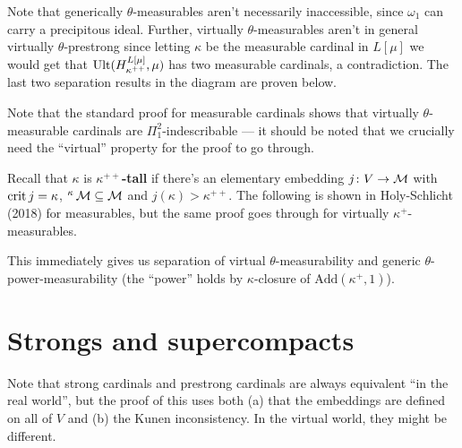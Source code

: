 Note that generically $\theta$-measurables aren't necessarily inaccessible, since $\omega_1$ can carry a precipitous ideal. Further, virtually $\theta$-measurables aren't in general virtually $\theta$-prestrong since letting $\kappa$ be the measurable cardinal in $L[\mu]$ we would get that $\operatorname{Ult}(H_{\kappa^{++}}^{L[\mu]},\mu)$ has two measurable cardinals, a contradiction. The last two separation results in the diagram are proven below.


Note that the standard proof for measurable cardinals shows that virtually $\theta$-measurable cardinals are $\Pi^2_1$-indescribable --- it should be noted that we crucially need the ``virtual'' property for the proof to go through.

\qquad Recall that $\kappa$ is \textbf{$\kappa^{++}$-tall} if there's an elementary embedding $j\colon V\to\operatorname{\mathcal M}$ with $\operatorname{crit} j=\kappa$, ${^\kappa\operatorname{\mathcal M}}\subseteq\operatorname{\mathcal M}$ and $j(\kappa)>\kappa^{++}$. The following is shown in Holy-Schlicht (2018) for measurables, but the same proof goes through for virtually $\kappa^+$-measurables.


This immediately gives us separation of virtual $\theta$-measurability and generic $\theta$-power-measurability (the ``power'' holds by $\kappa$-closure of $\text{Add}(\kappa^+,1)$).

\section{Strongs and supercompacts}

Note that strong cardinals and prestrong cardinals are always equivalent ``in the real world'', but the proof of this uses both (a) that the embeddings are defined on all of $V$ and (b) the Kunen inconsistency. In the virtual world, they might be different.


